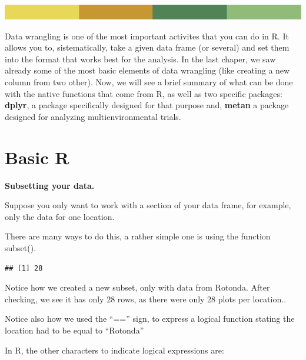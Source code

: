 \documentclass[
]{book}
\newenvironment{Shaded}{\begin{snugshade}}{\end{snugshade}}
\newcommand{\FunctionTok}[1]{\textcolor[rgb]{0.00,0.00,0.00}{#1}}
\newcommand{\NormalTok}[1]{#1}
\newcommand{\OtherTok}[1]{\textcolor[rgb]{0.56,0.35,0.01}{#1}}
\newcommand{\SpecialCharTok}[1]{\textcolor[rgb]{0.00,0.00,0.00}{#1}}
\newcommand{\StringTok}[1]{\textcolor[rgb]{0.31,0.60,0.02}{#1}}
\begin{document}
\includegraphics{rsrstrip.png}

Data wrangling is one of the most important activites that you can do in R. It allows you to, sistematically, take a given data frame (or several) and set them into the format that works best for the analysis. In the last chaper, we saw already some of the most basic elements of data wrangling (like creating a new column from two other). Now, we will see a brief summary of what can be done with the native functions that come from R, as well as two specific packages: \textbf{dplyr}, a package specifically designed for that purpose and, \textbf{metan} a package designed for analyzing multienvironmental trials.

\hypertarget{basic-r}{%
\section{Basic R}\label{basic-r}}

\textbf{Subsetting your data. }

Suppose you only want to work with a section of your data frame, for example, only the data for one location.

There are many ways to do this, a rather simple one is using the function subset().

\begin{Shaded}
\end{Shaded}

\begin{verbatim}
## [1] 28
\end{verbatim}

Notice how we created a new subset, only with data from Rotonda. After checking, we see it has only 28 rows, as there were only 28 plots per location..

Notice also how we used the ``=='' sign, to express a logical function stating the location had to be equal to ``Rotonda''

In R, the other characters to indicate logical expressions are:\\
\end{document}
